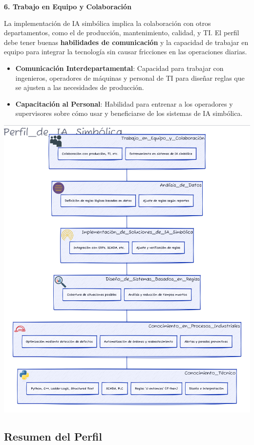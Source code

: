 \documentclass[
  10pt,
  letterpaper,
]{book}
\providecommand{\tightlist}{%
  \setlength{\itemsep}{0pt}\setlength{\parskip}{0pt}}\usepackage{longtable,booktabs,array}
\begin{document}
\textbf{6. Trabajo en Equipo y Colaboración}

La implementación de IA simbólica implica la colaboración con otros
departamentos, como el de producción, mantenimiento, calidad, y TI. El
perfil debe tener buenas \textbf{habilidades de comunicación} y la
capacidad de trabajar en equipo para integrar la tecnología sin causar
fricciones en las operaciones diarias.

\begin{itemize}
\tightlist
\item
  \textbf{Comunicación Interdepartamental}: Capacidad para trabajar con
  ingenieros, operadores de máquinas y personal de TI para diseñar
  reglas que se ajusten a las necesidades de producción.
\item
  \textbf{Capacitación al Personal}: Habilidad para entrenar a los
  operadores y supervisores sobre cómo usar y beneficiarse de los
  sistemas de IA simbólica.
\end{itemize}

\includegraphics[width=1\textwidth,height=\textheight]{index_files/mediabag/diagram-3.pdf}

\subsection{\texorpdfstring{\textbf{Resumen del
Perfil}}{Resumen del Perfil}}\label{resumen-del-perfil}
\end{document}
